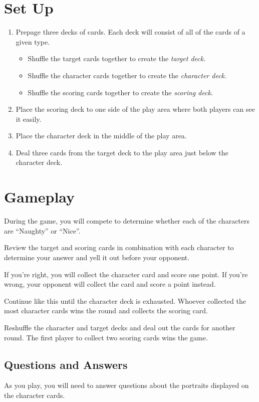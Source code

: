 \documentclass[11pt, parskip=half]{scrartcl}
\begin{document}
\newpage

\section*{Set Up}
\begin{enumerate}[leftmargin=*]
  \item Prepage three decks of cards. Each deck will consist of all of the cards of a given type.
  \begin{itemize}[leftmargin=*]
  	\item Shuffle the target cards together to create the \emph{target deck}.
  	\item Shuffle the character cards together to create the \emph{character deck}.
  	\item Shuffle the scoring cards together to create the \emph{scoring deck}.
  \end{itemize}
  \item Place the scoring deck to one side of the play area where both players can see it easily.
  \item Place the character deck in the middle of the play area.
  \item Deal three cards from the target deck to the play area just below the character deck. 
 \end{enumerate}
 
\newpage
\section*{Gameplay}
During the game, you will compete to determine whether each of the characters are ``Naughty'' or ``Nice''.

Review the target and scoring cards in combination with each character to determine your answer and yell it out before your opponent.

If you're right, you will collect the character card and score one point. If you're wrong, your opponent will collect the card and score a point instead.

Continue like this until the character deck is exhausted. Whoever collected the most character cards wins the round and collects the scoring card.

Reshuffle the character and target decks and deal out the cards for another round. The first player to collect two scoring cards wins the game. 

\subsection*{Questions and Answers}
As you play, you will need to answer questions about the portraits displayed on the character cards.
\end{document}
